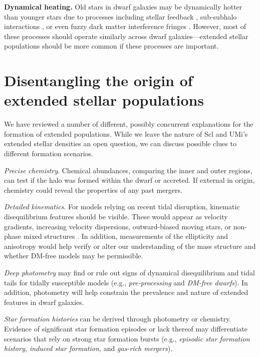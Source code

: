 \textbf{Dynamical heating.} Old stars in dwarf galaxies may be
dynamically hotter than younger stars due to processes including stellar
feedback
\citep{stinson+2009, maxwell+2012, el-badry+2016, mercado+2021},
sub-subhalo interactions \citep{penarrubia+2025}, or even fuzzy dark
matter interference fringes
\citep[e.g.,][]{el-zant+2020, duttachowdhury+2023}. However, most of
these processes should operate similarly across dwarf
galaxies---extended stellar populations should be more common if these
processes are important.

\section{Disentangling the origin of extended stellar
populations}\label{disentangling-the-origin-of-extended-stellar-populations}

We have reviewed a number of different, possibly concurrent explanations
for the formation of extended populations. While we leave the nature of
Scl and UMi's extended stellar densities an open question, we can
discuss possible clues to different formation scenarios.

\emph{Precise chemistry}. Chemical abundances, comparing the inner and
outer regions, can test if the halo was formed within the dwarf or
accreted. If external in origin, chemistry could reveal the properties
of any past mergers.

\emph{Detailed kinematics}. For models relying on recent tidal
disruption, kinematic disequilibrium features should be visible. These
would appear as velocity gradients, increasing velocity dispersions,
outward-biased moving stars, or non-phase mixed structures
\citep[e.g,][]{kroupa1997, read+2006, sanchez-salcedo+hernandez2007}. In
addition, measurements of the ellipticity and anisotropy would help
verify or alter our understanding of the mass structure and whether
DM-free models may be permissible.

\emph{Deep photometry} may find or rule out signs of dynamical
disequilibrium and tidal tails for tidally susceptible models (e.g.,
\emph{pre-processing} and \emph{DM-free dwarfs}). In addition,
photometry will help constrain the prevalence and nature of extended
features in dwarf galaxies.

\emph{Star formation histories} can be derived through photometry or
chemistry. Evidence of significant star formation episodes or lack
thereof may differentiate scenarios that rely on strong star formation
bursts (e.g., \emph{episodic star formation history, induced star
formation,} and \emph{gas-rich mergers}).

